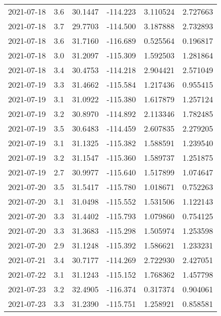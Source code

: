 \begin{tabular}{lrrrrr}
2021-07-18 &       3.6 &  30.1447 &  -114.223 &         3.110524 &         2.727663 \\
2021-07-18 &       3.7 &  29.7703 &  -114.500 &         3.187888 &         2.732893 \\
2021-07-18 &       3.6 &  31.7160 &  -116.689 &         0.525564 &         0.196817 \\
2021-07-18 &       3.0 &  31.2097 &  -115.309 &         1.592503 &         1.281864 \\
2021-07-18 &       3.4 &  30.4753 &  -114.218 &         2.904421 &         2.571049 \\
2021-07-19 &       3.3 &  31.4662 &  -115.584 &         1.217436 &         0.955415 \\
2021-07-19 &       3.1 &  31.0922 &  -115.380 &         1.617879 &         1.257124 \\
2021-07-19 &       3.2 &  30.8970 &  -114.892 &         2.113346 &         1.782485 \\
2021-07-19 &       3.5 &  30.6483 &  -114.459 &         2.607835 &         2.279205 \\
2021-07-19 &       3.1 &  31.1325 &  -115.382 &         1.588591 &         1.239540 \\
2021-07-19 &       3.2 &  31.1547 &  -115.360 &         1.589737 &         1.251875 \\
2021-07-19 &       2.7 &  30.9977 &  -115.640 &         1.517899 &         1.074647 \\
2021-07-20 &       3.5 &  31.5417 &  -115.780 &         1.018671 &         0.752263 \\
2021-07-20 &       3.1 &  31.0498 &  -115.552 &         1.531506 &         1.122143 \\
2021-07-20 &       3.3 &  31.4402 &  -115.793 &         1.079860 &         0.754125 \\
2021-07-20 &       3.3 &  31.3683 &  -115.298 &         1.505974 &         1.253598 \\
2021-07-20 &       2.9 &  31.1248 &  -115.392 &         1.586621 &         1.233231 \\
2021-07-21 &       3.4 &  30.7177 &  -114.269 &         2.722930 &         2.427051 \\
2021-07-22 &       3.1 &  31.1243 &  -115.152 &         1.768362 &         1.457798 \\
2021-07-23 &       3.2 &  32.4905 &  -116.374 &         0.317374 &         0.904061 \\
2021-07-23 &       3.3 &  31.2390 &  -115.751 &         1.258921 &         0.858581 \\

\end{tabular}
